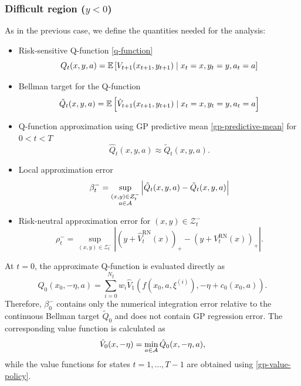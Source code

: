 \subsubsection{Difficult region ($y < 0$)}
\label{theory:negative-error}

As in the previous case, we define the quantities needed for the analysis:
\begin{itemize}
	\item Risk-sensitive Q-function \eqref{q-function}
	\begin{equation*}
		Q_t(x, y, a) = \mathbb{E} \left[ V_{t+1}(x_{t+1}, y_{t+1}) \mid x_t = x, y_t = y, a_t = a \right]
	\end{equation*}
	\item Bellman target for the Q-function
	\begin{equation*}
		\tilde{Q}_t(x, y, a) = \mathbb{E} \left[ \hat{V}_{t+1}(x_{t+1}, y_{t+1}) \mid x_t = x, y_t = y, a_t = a \right]
	\end{equation*}
	\item Q-function approximation using GP predictive mean \eqref{gp-predictive-mean} for $0 < t < T$
	\begin{equation*}
		\hat{Q}_t(x, y, a) \approx \tilde{Q}_t(x, y, a).
	\end{equation*}
	\item Local approximation error
	\begin{equation*}
		\beta_t^- = \sup_{\substack{(x, y) \in \mathcal{Z}_t^- \\ a \in \mathcal{A}}} \left| \hat{Q}_t(x, y, a) - \tilde{Q}_t(x, y, a) \right|
	\end{equation*}
	\item Risk-neutral approximation error for $(x, y) \in \mathcal{Z}_t^-$
	\begin{equation*}
		\rho_t^- = \sup_{(x, y) \in \mathcal{Z}_t^-} \left| (y + \hat{V}_t^{\text{RN}}(x))_+ - (y + V_t^{\text{RN}}(x))_+ \right|.
	\end{equation*}
\end{itemize}

At $t=0$, the approximate Q-function is evaluated directly as
\begin{equation*}
	\hat{Q}_0(x_0, -\eta, a) = \sum_{i=0}^{N_\xi} w_i
	\hat{V}_1\left( f(x_0,a,\xi^{(i)}), -\eta+c_0(x_0,a) \right).
\end{equation*}
Therefore, $\beta_0^-$ contains only the numerical
integration error relative to the continuous Bellman
target $\tilde{Q}_0$ and does not contain GP regression error. The corresponding value function is calculated as
\begin{equation}
	\hat{V}_0(x, -\eta) = \min_{a \in \mathcal{A}} \hat{Q}_0(x, -\eta, a)
	\notag
	\label{root-value-approx},
\end{equation}
while the value functions for states $t=1, \dots, T-1$ are obtained using \eqref{gp-value-policy}.

